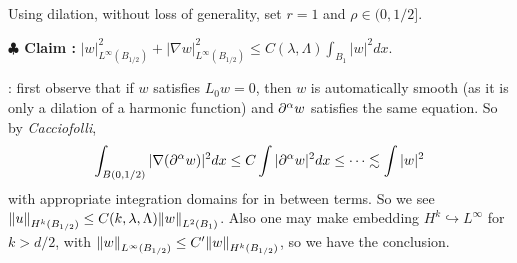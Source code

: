 \documentclass[12pt,a4paper]{article}
\newenvironment{proof}
{\begin{changemargin}{0.5cm}{0.5cm} 
	}%
	{\end{changemargin}
}
\newenvironment{subproof}
{\begin{changemargin}{0.5cm}{0.5cm} 
	}%
	{\end{changemargin}
}
\newenvironment{p}
{\begin{proof} 
	}%
	{\end{proof}
}
\begin{document}
\begin{p}
\pf Using dilation, without loss of generality, set $r=1$ and $\rho \in (0,1/2]$.

\textbf{$\clubsuit$ Claim :} $|w|^2_{L^{\infty}(B_{1/2})} + |\nabla w|^2_{L^{\infty}(B_{1/2})} \leq C(\lambda, \Lambda)\int_{B_1} |w|^2 dx$.
\begin{subproof}
: first observe that if $w$ satisfies $L_0 w =0$, then $w$ is automatically smooth (as it is only a dilation of a harmonic function) and $\partial^{\alpha} w$ satisfies the same equation. So by \emph{Cacciofolli},
\begin{align*}
\int_{B(0, 1/2)} |\nabla (\partial^{\alpha} w)|^2 dx \leq C \int |\partial^{\alpha} w|^2 dx \leq \cdots \lesssim \int |w|^2 
\end{align*}
with appropriate integration domains for in between terms. So we see $\snorms{u}{H^k(B_{1/2})} \leq C(k, \lambda, \Lambda)\snorms{w}{L^2(B_1)}$. Also one may make embedding $H^k \hookrightarrow L^{\infty}$ for $k>d/2$, with $\snorms{w}{L^{\infty}(B_{1/2})} \leq C' \snorms{w}{H^k(B_{1/2})}$, so we have the conclusion.


\end{subproof}
\end{p}
\end{document}
